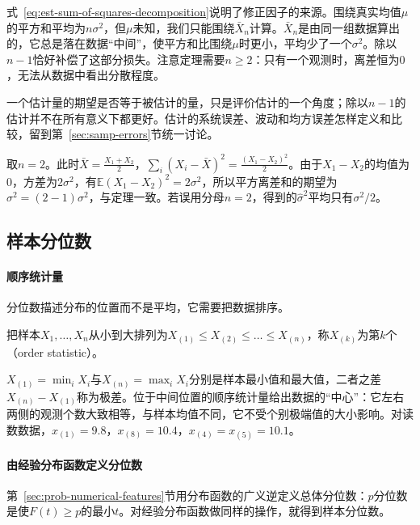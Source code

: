 式~\eqref{eq:est-sum-of-squares-decomposition}说明了修正因子的来源。围绕真实均值$\mu$的平方和平均为$n\sigma^2$，但$\mu$未知，我们只能围绕$\bar X_n$计算。$\bar X_n$是由同一组数据算出的，它总是落在数据“中间”，使平方和比围绕$\mu$时更小，平均少了一个$\sigma^2$。除以$n-1$恰好补偿了这部分损失。注意定理需要$n\ge2$：只有一个观测时，离差恒为$0$，无法从数据中看出分散程度。

一个估计量的期望是否等于被估计的量，只是评价估计的一个角度；除以$n-1$的估计并不在所有意义下都更好。估计的系统误差、波动和均方误差怎样定义和比较，留到第~\ref{sec:samp-errors}节统一讨论。

\begin{example}[两个观测的平方离差]
\label{ex:est-two-observations}
取$n=2$。此时$\bar X=\frac{X_1+X_2}2$，$\sum_i(X_i-\bar X)^2=\frac{(X_1-X_2)^2}{2}$。由于$X_1-X_2$的均值为$0$，方差为$2\sigma^2$，有$\mathbb{E}(X_1-X_2)^2=2\sigma^2$，所以平方离差和的期望为$\sigma^2=(2-1)\sigma^2$，与定理一致。若误用分母$n=2$，得到的$\hat\sigma^2$平均只有$\sigma^2/2$。
\end{example}

\subsection{样本分位数}

\paragraph{顺序统计量}
分位数描述分布的位置而不是平均，它需要把数据排序。

\begin{definition}[顺序统计量]
\label{def:est-order-statistics}
把样本$X_1,\dots,X_n$从小到大排列为$X_{(1)}\le X_{(2)}\le\dots\le X_{(n)}$，称$X_{(k)}$为第$k$个（order statistic）。
\end{definition}

$X_{(1)}=\min_iX_i$与$X_{(n)}=\max_iX_i$分别是样本最小值和最大值，二者之差$X_{(n)}-X_{(1)}$称为极差。位于中间位置的顺序统计量给出数据的“中心”：它左右两侧的观测个数大致相等，与样本均值不同，它不受个别极端值的大小影响。对读数数据，$x_{(1)}=9.8$，$x_{(8)}=10.4$，$x_{(4)}=x_{(5)}=10.1$。

\paragraph{由经验分布函数定义分位数}
第~\ref{sec:prob-numerical-features}节用分布函数的广义逆定义总体分位数：$p$分位数是使$F(t)\ge p$的最小$t$。对经验分布函数做同样的操作，就得到样本分位数。

